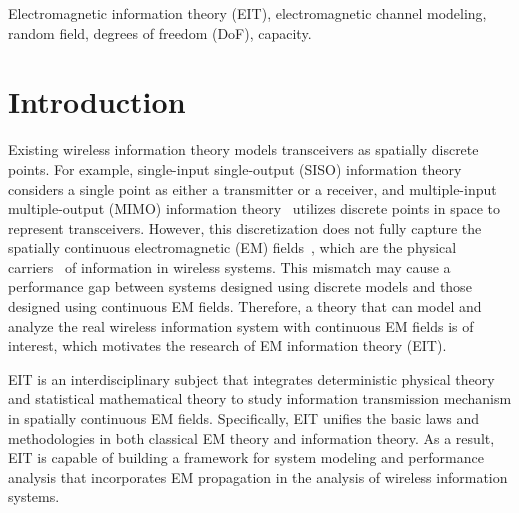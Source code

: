 \documentclass[journal,twocolumn]{IEEEtran}
\begin{document}
\begin{IEEEkeywords}
    Electromagnetic information theory (EIT), electromagnetic channel modeling, random field, degrees of freedom (DoF), capacity.  
\end{IEEEkeywords}

\vspace{-1em}
\section{Introduction}
Existing wireless information theory models transceivers as spatially discrete points. For example, single-input single-output (SISO) information theory considers a single point as either a transmitter or a receiver, and multiple-input multiple-output (MIMO) information theory~\cite{goldsmith2003capacity} utilizes discrete points in space to represent transceivers. 
However, this discretization does not fully capture the spatially continuous electromagnetic (EM) fields~\cite{huang2020holographic}, which are the physical carriers~\cite{migliore2018horse} of information in wireless systems. 
This mismatch may cause a performance gap between systems designed using discrete models and those designed using continuous EM fields. 
Therefore, a theory that can model and analyze the real wireless information system with continuous EM fields is of interest, which motivates the research of EM information theory (EIT).

EIT is an interdisciplinary subject that integrates deterministic physical theory and statistical mathematical theory to study information transmission mechanism in spatially continuous EM fields. 
Specifically, EIT unifies the basic laws and methodologies in both classical EM theory and information theory. 
As a result, EIT is capable of building a framework for system modeling and performance analysis that incorporates EM propagation in the analysis of wireless information systems. 
\end{document}
